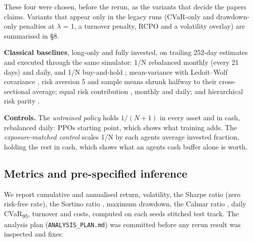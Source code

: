 \documentclass[11pt]{article}
\begin{document}
These four were chosen, before the rerun, as the variants that decide the paper\textquotesingle s claims. Variants that appear only in the legacy runs (CVaR-only and drawdown-only penalties at $\lambda$ = 1, a turnover penalty, RCPO and a volatility overlay) are summarised in \S{}8.

\textbf{Classical baselines}, long-only and fully invested, on trailing 252-day estimates and executed through the same simulator: 1/N rebalanced monthly (every 21 days) and daily, and 1/N buy-and-hold \cite{r4}; mean-variance \cite{r1} with Ledoit--Wolf covariance \cite{r5}, risk aversion 5 and sample means shrunk halfway to their cross-sectional average; equal risk contribution \cite{r6,r7}, monthly and daily; and hierarchical risk parity \cite{r8}.

\textbf{Controls.} The \emph{untrained policy} holds \(1/(N+1)\) in every asset and in cash, rebalanced daily: PPO\textquotesingle s starting point, which shows what training adds. The \emph{exposure-matched control} scales 1/N by each agent\textquotesingle s average invested fraction, holding the rest in cash, which shows what an agent\textquotesingle s cash buffer alone is worth.

\subsection{Metrics and pre-specified inference}\label{metrics-and-pre-specified-inference}

We report cumulative and annualised return, volatility, the Sharpe ratio (zero risk-free rate), the Sortino ratio \cite{r34}, maximum drawdown, the Calmar ratio \cite{r35}, daily CVaR\textsubscript{95}, turnover and costs, computed on each seed\textquotesingle s stitched test track. The analysis plan (\texttt{ANALYSIS\_PLAN.md}) was committed before any rerun result was inspected and fixes:
\end{document}
